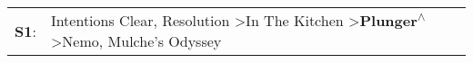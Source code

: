 \begin{supertabular}{p{0.03\textwidth}p{0.92\textwidth}}
 \textbf{S1}:  &  Intentions Clear\textsuperscript{}, \enspace Resolution\textsuperscript{} \textgreater \enspace In The Kitchen\textsuperscript{} \textgreater \enspace \textbf{Plunger\textsuperscript{$\wedge$}} \textgreater \enspace Nemo\textsuperscript{}, \enspace Mulche's Odyssey\textsuperscript{}  \enspace  \\
\end{supertabular}
